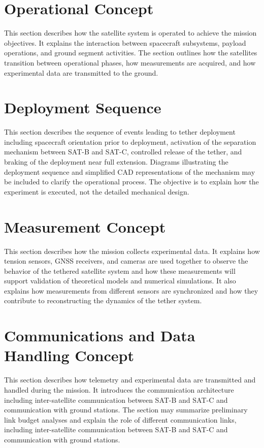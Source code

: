 \section{Operational Concept}

This section describes how the satellite system is operated to achieve the mission objectives. It explains the interaction between spacecraft subsystems, payload operations, and ground segment activities. The section outlines how the satellites transition between operational phases, how measurements are acquired, and how experimental data are transmitted to the ground.

\section{Deployment Sequence}

This section describes the sequence of events leading to tether deployment including spacecraft orientation prior to deployment, activation of the separation mechanism between SAT-B and SAT-C, controlled release of the tether, and braking of the deployment near full extension. Diagrams illustrating the deployment sequence and simplified CAD representations of the mechanism may be included to clarify the operational process. The objective is to explain how the experiment is executed, not the detailed mechanical design.

\section{Measurement Concept}

This section describes how the mission collects experimental data. It explains how tension sensors, GNSS receivers, and cameras are used together to observe the behavior of the tethered satellite system and how these measurements will support validation of theoretical models and numerical simulations. It also explains how measurements from different sensors are synchronized and how they contribute to reconstructing the dynamics of the tether system. 

\section{Communications and Data Handling Concept}
This section describes how telemetry and experimental data are transmitted and handled during the mission. It introduces the communication architecture including inter-satellite communication between SAT-B and SAT-C and communication with ground stations. 
The section may summarize preliminary link budget analyses and explain the role of different communication links, including inter-satellite communication between SAT-B and SAT-C and communication with ground stations.
